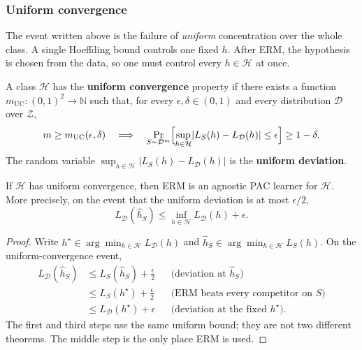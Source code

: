 \subsubsection{Uniform convergence}
\label{subsubsec:mlu-uc}

The event written above is the failure of \emph{uniform} concentration over the whole class. A single Hoeffding bound controls one fixed $h$. After ERM, the hypothesis is chosen from the data, so one must control every $h\in\mathcal{H}$ at once.

\begin{definition}
\label{def:mlu-uc}
A class $\mathcal{H}$ has the \textbf{uniform convergence} property if there exists a function $m_{\mathrm{UC}}:(0,1)^2\to\mathbb{N}$ such that, for every $\epsilon,\delta\in(0,1)$ and every distribution $\mathcal{D}$ over $\mathcal{Z}$,
\[
m\ge m_{\mathrm{UC}}(\epsilon,\delta)
\quad\Longrightarrow\quad
\Pr_{S\sim\mathcal{D}^m}\Bigl[\sup_{h\in\mathcal{H}}\lvert L_S(h)-L_{\mathcal{D}}(h)\rvert\le\epsilon\Bigr]\ge 1-\delta.
\]
The random variable $\sup_{h\in\mathcal{H}}\lvert L_S(h)-L_{\mathcal{D}}(h)\rvert$ is the \textbf{uniform deviation}.
\end{definition}

\begin{proposition}
\label{prop:mlu-uc-implies-agnostic}
If $\mathcal{H}$ has uniform convergence, then ERM is an agnostic PAC learner for $\mathcal{H}$. More precisely, on the event that the uniform deviation is at most $\epsilon/2$,
\[
L_{\mathcal{D}}(\widehat{h}_S)
\le
\inf_{h\in\mathcal{H}}L_{\mathcal{D}}(h)+\epsilon.
\]
\end{proposition}

\begin{proof}
Write $h^\star\in\arg\min_{h\in\mathcal{H}}L_{\mathcal{D}}(h)$ and $\widehat{h}_S\in\arg\min_{h\in\mathcal{H}}L_S(h)$. On the uniform-convergence event,
\begin{align*}
L_{\mathcal{D}}(\widehat{h}_S)
&\le
L_S(\widehat{h}_S)+\frac{\epsilon}{2}
&&\text{(deviation at $\widehat{h}_S$)}\\
&\le
L_S(h^\star)+\frac{\epsilon}{2}
&&\text{(ERM beats every competitor on $S$)}\\
&\le
L_{\mathcal{D}}(h^\star)+\epsilon
&&\text{(deviation at the fixed $h^\star$).}
\end{align*}
The first and third steps use the same uniform bound; they are not two different theorems. The middle step is the only place ERM is used.
\end{proof}

